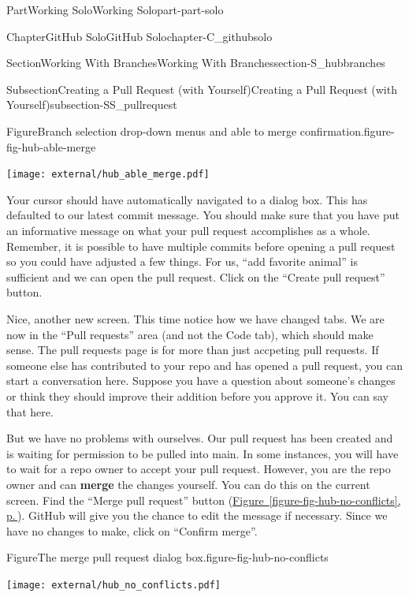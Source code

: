 \documentclass[twoside,10pt,]{book}
\newcommand{\xreffont}{\relax}
\newcommand{\terminology}[1]{\textbf{#1}}
\begin{document}
\begin{partptx}{Part}{Working Solo}{}{Working Solo}{}{}{part-part-solo}
\begin{chapterptx}{Chapter}{GitHub Solo}{}{GitHub Solo}{}{}{chapter-C_githubsolo}
\begin{sectionptx}{Section}{Working With Branches}{}{Working With Branches}{}{}{section-S_hubbranches}
\begin{subsectionptx}{Subsection}{Creating a Pull Request (with Yourself)}{}{Creating a Pull Request (with Yourself)}{}{}{subsection-SS_pullrequest}
\begin{figureptx}{Figure}{Branch selection drop-down menus and able to merge confirmation.}{figure-fig-hub-able-merge}{}
\begin{image}{0.1}{0.8}{0.1}{}%
\texttt{[image: external/hub\_able\_merge.pdf]}
\end{image}%
\tcblower
\end{figureptx}%
Your cursor should have automatically navigated to a dialog box. This has defaulted to our latest commit message. You should make sure that you have put an informative message on what your pull request accomplishes as a whole. Remember, it is possible to have multiple commits before opening a pull request so you could have adjusted a few things. For us, ``add favorite animal'' is sufficient and we can open the pull request. Click on the ``Create pull request'' button.%
\par
Nice, another new screen. This time notice how we have changed tabs. We are now in the ``Pull requests'' area (and not the Code tab), which should make sense. The pull requests page is for more than just accpeting pull requests. If someone else has contributed to your repo and has opened a pull request, you can start a conversation here. Suppose you have a question about someone's changes or think they should improve their addition before you approve it. You can say that here.%
\par
But we have no problems with ourselves. Our pull request has been created and is waiting for permission to be pulled into main. In some instances, you will have to wait for a repo owner to accept your pull request. However, you are the repo owner and can \terminology{merge} the changes yourself. You can do this on the current screen. Find the ``Merge pull request'' button (\hyperref[figure-fig-hub-no-conflicts]{Figure~{\xreffont\ref{figure-fig-hub-no-conflicts}}, p.\,\pageref{figure-fig-hub-no-conflicts}}). GitHub will give you the chance to edit the message if necessary. Since we have no changes to make, click on ``Confirm merge''.%
\begin{figureptx}{Figure}{The merge pull request dialog box.}{figure-fig-hub-no-conflicts}{}%
\begin{image}{0.05}{0.9}{0.05}{}%
\texttt{[image: external/hub\_no\_conflicts.pdf]}
\end{image}%
\tcblower
\end{figureptx}%

\end{subsectionptx}
\end{sectionptx}
\end{chapterptx}
\end{partptx}
\end{document}
